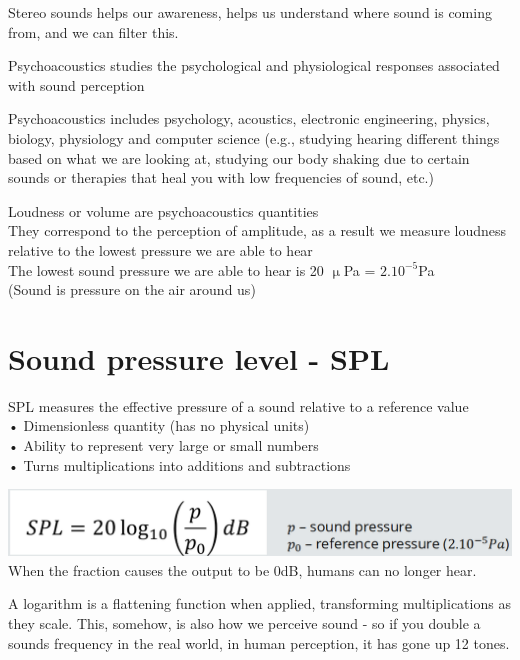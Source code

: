 \documentclass[]{project_plan}
\begin{document}
Stereo sounds helps our awareness, helps us understand where sound is coming from, and we can filter this.

Psychoacoustics studies the psychological and physiological
responses associated with sound perception

Psychoacoustics includes psychology, acoustics, electronic
engineering, physics, biology, physiology and
computer science (e.g., studying hearing different things based on what we are looking at, studying our body shaking due to certain sounds or therapies that heal you with low frequencies of sound, etc.)

Loudness or volume are psychoacoustics quantities\\
They correspond to the perception of amplitude, as a result we measure loudness relative to the lowest pressure we are able to hear\\
The lowest sound pressure we are able to hear is 20 $\upmu$Pa = $2.10^{-5}$Pa\\
(Sound is pressure on the air around us)

\section{Sound pressure level - SPL}
SPL measures the effective pressure of a sound relative to a reference value\\
• Dimensionless quantity (has no physical units)\\
• Ability to represent very large or small numbers\\
• Turns multiplications into additions and subtractions

\includegraphics[width=\linewidth]{SPL_formula.png}
When the fraction causes the output to be 0dB, humans can no longer hear.

A logarithm is a flattening function when applied, transforming multiplications as they scale.
This, somehow, is also how we perceive sound - so if you double a sounds frequency in the real world, in human perception, it has gone up 12 tones.
\end{document}
